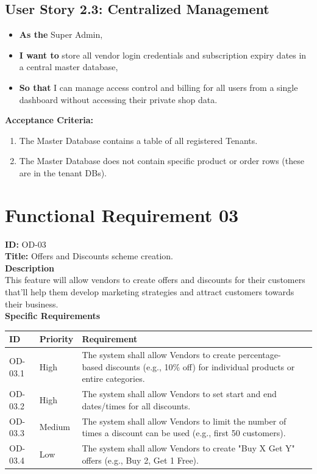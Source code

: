 \vspace{1em}
\subsection*{User Story 2.3: Centralized Management}
\begin{itemize}
    \item \textbf{As the} Super Admin,
    \item \textbf{I want to} store all vendor login credentials and subscription expiry dates in a central master database,
    \item \textbf{So that} I can manage access control and billing for all users from a single dashboard without accessing their private shop data.
\end{itemize}

\noindent\textbf{Acceptance Criteria:}
\begin{enumerate}
    \item The Master Database contains a table of all registered Tenants.
    \item The Master Database does not contain specific product or order rows (these are in the tenant DBs).
\end{enumerate}


\section{Functional Requirement 03}

\textbf{ID:} OD-03 \\
\textbf{Title:} Offers and Discounts scheme creation.\\
\textbf{Description}\\
This feature will allow vendors to create offers and discounts for their customers that’ll help them develop marketing strategies and attract customers towards their business.
\\
\textbf{Specific Requirements}

\begin{table}[H]
\centering
\label{tab:vendor-requirements}
\begin{tabular}{>{\raggedright\arraybackslash}p{2cm}>{\raggedright\arraybackslash}p{3cm}>{\raggedright\arraybackslash}p{7cm}>{\centering\arraybackslash}p{2cm}}
\toprule
\textbf{ID} & \textbf{Priority} & \textbf{Requirement} \\
\midrule
OD-03.1 & High & The system shall allow Vendors to create percentage-based discounts (e.g., 10\% off) for individual products or entire categories. \\
\midrule
OD-03.2 & High & The system shall allow Vendors to set start and end dates/times for all discounts. \\
\midrule
OD-03.3 & Medium & The system shall allow Vendors to limit the number of times a discount can be used (e.g., first 50 customers).  \\
\midrule
OD-03.4 & Low & The system shall allow Vendors to create "Buy X Get Y" offers (e.g., Buy 2, Get 1 Free). \\
\bottomrule
\end{tabular}
\end{table}

